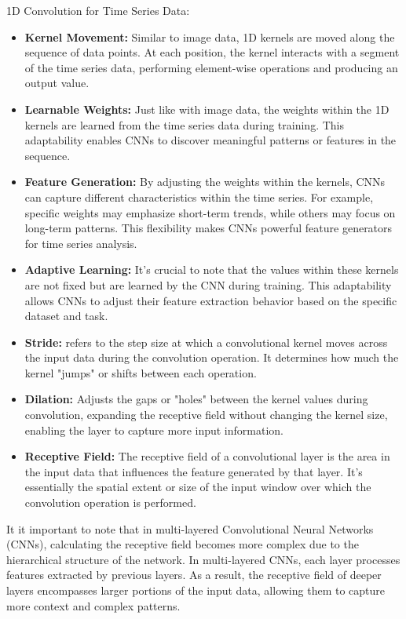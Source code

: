 \documentclass{article}
\begin{document}
1D Convolution for Time Series Data:
\begin{itemize}
    \item \textbf{Kernel Movement:} Similar to image data, 1D kernels are moved along the sequence of data points. At each position, the kernel interacts with a segment of the time series data, performing element-wise operations and producing an output value.
    \item \textbf{Learnable Weights:} Just like with image data, the weights within the 1D kernels are learned from the time series data during training. This adaptability enables CNNs to discover meaningful patterns or features in the sequence.
    \item \textbf{Feature Generation:} By adjusting the weights within the kernels, CNNs can capture different characteristics within the time series. For example, specific weights may emphasize short-term trends, while others may focus on long-term patterns. This flexibility makes CNNs powerful feature generators for time series analysis.
    \item \textbf{Adaptive Learning:} It's crucial to note that the values within these kernels are not fixed but are learned by the CNN during training. This adaptability allows CNNs to adjust their feature extraction behavior based on the specific dataset and task.
    \item \textbf{Stride:} refers to the step size at which a convolutional kernel moves across the input data during the convolution operation. It determines how much the kernel "jumps" or shifts between each operation.
    \item \textbf{Dilation:} Adjusts the gaps or "holes" between the kernel values during convolution, expanding the receptive field without changing the kernel size, enabling the layer to capture more input information.
    \item \textbf{Receptive Field:} The receptive field of a convolutional layer is the area in the input data that influences the feature generated by that layer. It's essentially the spatial extent or size of the input window over which the convolution operation is performed.
\end{itemize}

It it important to note that in multi-layered Convolutional Neural Networks (CNNs), calculating the receptive field becomes more complex due to the hierarchical structure of the network.
In multi-layered CNNs, each layer processes features extracted by previous layers. As a result, the receptive field of deeper layers encompasses larger portions of the input data, allowing them to capture more context and complex patterns.
\end{document}

